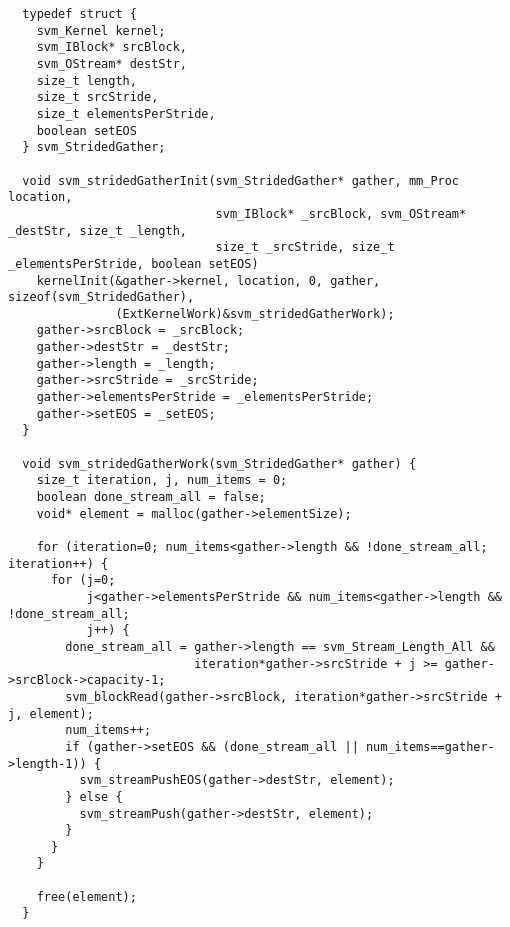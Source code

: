 \clearpage
\makeline
{}
{\small
\begin{verbatim}
  typedef struct {
    svm_Kernel kernel;
    svm_IBlock* srcBlock,
    svm_OStream* destStr,
    size_t length,
    size_t srcStride,
    size_t elementsPerStride,
    boolean setEOS
  } svm_StridedGather;

  void svm_stridedGatherInit(svm_StridedGather* gather, mm_Proc location, 
                             svm_IBlock* _srcBlock, svm_OStream* _destStr, size_t _length,
                             size_t _srcStride, size_t _elementsPerStride, boolean setEOS)
    kernelInit(&gather->kernel, location, 0, gather, sizeof(svm_StridedGather), 
               (ExtKernelWork)&svm_stridedGatherWork);
    gather->srcBlock = _srcBlock;
    gather->destStr = _destStr;
    gather->length = _length;
    gather->srcStride = _srcStride;
    gather->elementsPerStride = _elementsPerStride;
    gather->setEOS = _setEOS;
  }

  void svm_stridedGatherWork(svm_StridedGather* gather) {
    size_t iteration, j, num_items = 0;
    boolean done_stream_all = false;
    void* element = malloc(gather->elementSize);

    for (iteration=0; num_items<gather->length && !done_stream_all; iteration++) {
      for (j=0; 
           j<gather->elementsPerStride && num_items<gather->length && !done_stream_all; 
           j++) {
        done_stream_all = gather->length == svm_Stream_Length_All && 
                          iteration*gather->srcStride + j >= gather->srcBlock->capacity-1;
        svm_blockRead(gather->srcBlock, iteration*gather->srcStride + j, element);
        num_items++;
        if (gather->setEOS && (done_stream_all || num_items==gather->length-1)) {
          svm_streamPushEOS(gather->destStr, element);
        } else {
          svm_streamPush(gather->destStr, element);
        }
      }
    }

    free(element);
  }
\end{verbatim}}

